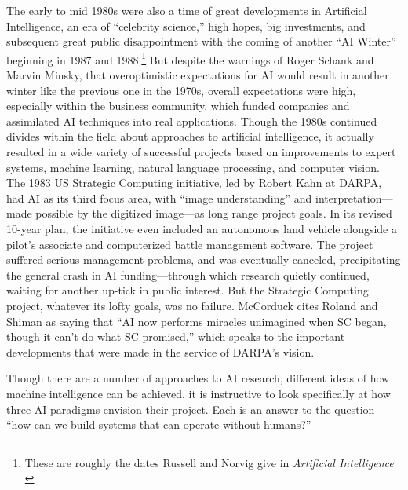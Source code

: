 The early to mid 1980s were also a time of great developments in
Artificial Intelligence, an era of ``celebrity science,'' high hopes,
big investments, and subsequent great public disappointment with the
coming of another ``AI Winter'' beginning in 1987 and
1988.\footnote{These are roughly the dates Russell and Norvig give in
  \emph{Artificial Intelligence} \cite{russellnorvig}} But despite the
warnings of Roger Schank and Marvin Minsky, that overoptimistic
expectations for AI would result in another winter like the previous
one in the 1970s, overall expectations were high, especially within
the business community, which funded companies and assimilated AI
techniques into real applications.\cite[afterword]{mccorduck} Though the 1980s continued divides
within the field about approaches to artificial intelligence, it
actually resulted in a wide variety of successful projects based on
improvements to expert systems, machine learning, natural language
processing, and computer vision.\cite[afterword]{mccorduck} The 1983 US Strategic Computing
initiative, led by Robert Kahn at DARPA, had AI as its third focus
area, with “image understanding” and interpretation—made possible by
the digitized image—as long range project goals. In its revised
10-year plan, the initiative even included an autonomous land vehicle
alongside a pilot's associate and computerized battle management
software. The project suffered serious management problems, and
was eventually canceled, precipitating the general crash in AI
funding—through which research quietly continued, waiting for another
up-tick in public interest. But the Strategic Computing project,
whatever its lofty goals, was no failure. McCorduck cites Roland and
Shiman as saying that ``AI now performs miracles unimagined when SC
began, though it can't do what SC promised,'' which speaks to the
important developments that were made in the service of DARPA's vision.\cite[afterword]{mccorduck}


Though there are a number of approaches to AI research, different
ideas of how machine intelligence can be achieved, it is instructive
to look specifically at how three AI paradigms envision their project.
Each is an answer to the question ``how can we build systems that
can operate without humans?''

